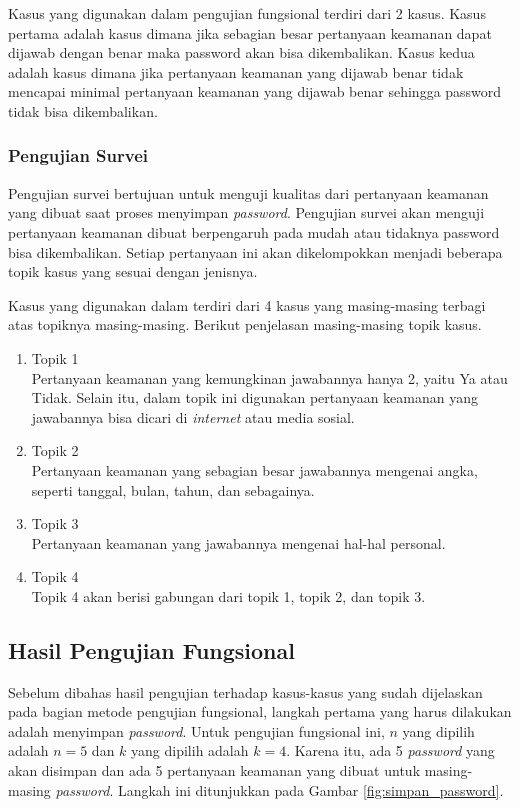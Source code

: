 Kasus yang digunakan dalam pengujian fungsional terdiri dari 2 kasus. Kasus pertama adalah kasus dimana jika sebagian besar pertanyaan keamanan dapat dijawab dengan benar maka password akan bisa dikembalikan. Kasus kedua adalah kasus dimana jika pertanyaan keamanan yang dijawab benar tidak mencapai minimal pertanyaan keamanan yang dijawab benar sehingga password tidak bisa dikembalikan.

\subsubsection{Pengujian Survei}

Pengujian survei bertujuan untuk menguji kualitas dari pertanyaan keamanan yang dibuat saat proses menyimpan \textit{password}. Pengujian survei akan menguji pertanyaan keamanan dibuat berpengaruh pada mudah atau tidaknya password bisa dikembalikan. Setiap pertanyaan ini akan dikelompokkan menjadi beberapa topik kasus yang sesuai dengan jenisnya.

Kasus yang digunakan dalam terdiri dari 4 kasus yang masing-masing terbagi atas topiknya masing-masing. Berikut penjelasan masing-masing topik kasus.

\begin{enumerate}[itemsep=0mm]
	\item Topik 1 \\
	Pertanyaan keamanan yang kemungkinan jawabannya hanya 2, yaitu Ya atau Tidak. Selain itu, dalam topik ini digunakan pertanyaan keamanan yang jawabannya bisa dicari di \textit{internet} atau media sosial.
	\item Topik 2 \\
	Pertanyaan keamanan yang sebagian besar jawabannya mengenai angka, seperti tanggal, bulan, tahun, dan sebagainya.
	\item Topik 3 \\
	Pertanyaan keamanan yang jawabannya mengenai hal-hal personal.
	\item Topik 4 \\
	Topik 4 akan berisi gabungan dari topik 1, topik 2, dan topik 3.
\end{enumerate}

\subsection{Hasil Pengujian Fungsional}\label{subsec:hasil_pengujian_fungsional}

Sebelum dibahas hasil pengujian terhadap kasus-kasus yang sudah dijelaskan pada bagian metode pengujian fungsional, langkah pertama yang harus dilakukan adalah menyimpan \textit{password}. Untuk pengujian fungsional ini, $n$ yang dipilih adalah $n=5$ dan $k$ yang dipilih adalah $k=4$. Karena itu, ada 5 \textit{password} yang akan disimpan dan ada 5 pertanyaan keamanan yang dibuat untuk masing-masing \textit{password}. Langkah ini ditunjukkan pada Gambar \ref{fig:simpan_password}.

